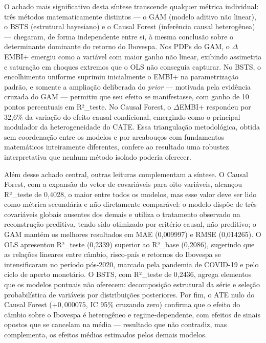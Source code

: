 \documentclass[	12pt, Times, openright, oneside, a4paper, english, brazil]{abntex2}
\begin{document}
O achado mais significativo desta síntese transcende qualquer métrica individual: três métodos matematicamente distintos — o GAM (modelo aditivo não linear), o BSTS (estrutural bayesiano) e o Causal Forest (inferência causal heterogênea) — chegaram, de forma independente entre si, à mesma conclusão sobre o determinante dominante do retorno do Ibovespa. Nos PDPs do GAM, o $\Delta$EMBI+ emergiu como a variável com maior ganho não linear, exibindo assimetria e saturação em choques extremos que o OLS não conseguia capturar. No BSTS, o encolhimento uniforme suprimiu inicialmente o EMBI+ na parametrização padrão, e somente a ampliação deliberada do \textit{prior} — motivada pela evidência cruzada do GAM — permitiu que seu efeito se manifestasse, com ganho de 10 pontos percentuais em R²\_teste. No Causal Forest, o $\Delta$EMBI+ respondeu por 32,6\% da variação do efeito causal condicional, emergindo como o principal modulador da heterogeneidade do CATE. Essa triangulação metodológica, obtida sem coordenação entre os modelos e por arcabouços com fundamentos matemáticos inteiramente diferentes, confere ao resultado uma robustez interpretativa que nenhum método isolado poderia oferecer.

Além desse achado central, outras leituras complementam a síntese. O Causal Forest, com a expansão do vetor de covariáveis para oito variáveis, alcançou R²\_teste de 0{,}4028, o maior entre todos os modelos, mas esse valor deve ser lido como métrica secundária e não diretamente comparável: o modelo dispõe de três covariáveis globais ausentes dos demais e utiliza o tratamento observado na reconstrução preditiva, tendo sido otimizado por critério causal, não preditivo; o GAM mantém os melhores resultados em MAE (0{,}009997) e RMSE (0{,}014265). O OLS apresentou R²\_teste (0{,}2339) superior ao R²\_base (0{,}2086), sugerindo que as relações lineares entre câmbio, risco-país e retornos do Ibovespa se intensificaram no período pós-2020, marcado pela pandemia de COVID-19 e pelo ciclo de aperto monetário. O BSTS, com R²\_teste de 0{,}2436, agrega elementos que os modelos pontuais não oferecem: decomposição estrutural da série e seleção probabilística de variáveis por distribuições posteriores. Por fim, o ATE nulo do Causal Forest ($+0{,}000075$, IC 95\% cruzando zero) confirma que o efeito do câmbio sobre o Ibovespa é heterogêneo e regime-dependente, com efeitos de sinais opostos que se cancelam na média — resultado que não contradiz, mas complementa, os efeitos médios estimados pelos demais modelos.
\end{document}
